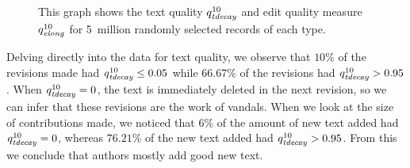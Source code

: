 \begin{figure}[tbhp]
    \begin{center}
    \end{center}
    \caption[Measuring edit and text quality over revisions]{
    	This graph shows the text quality $\quality{tdecay}{10}{}$
        and edit quality measure $\quality{elong}{10}{}$
	for 5~million randomly selected records of each type.
    }
    \label{fig-revs-quality}
\end{figure}

Delving directly into the data for text quality, we observe
that $10\%$ of the revisions made had
$\quality{tdecay}{10}{} \le 0.05$ while $66.67\%$ of the revisions had
$\quality{tdecay}{10}{} > 0.95$.
When $\quality{tdecay}{10}{} = 0$, the text is immediately deleted
in the next revision, so we can infer that these revisions
are the work of vandals.
When we look at the size of contributions made, we noticed that
$6\%$ of the amount of new text added had $\quality{tdecay}{10}{} = 0$,
whereas $76.21\%$ of the new text added had $\quality{tdecay}{10}{} > 0.95$.
From this we conclude that authors mostly add good new text.

